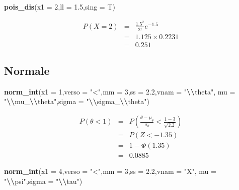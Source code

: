 \documentclass[
  11pt,
]{book}
\newenvironment{Shaded}{\begin{snugshade}}{\end{snugshade}}
\newcommand{\AttributeTok}[1]{\textcolor[rgb]{0.13,0.29,0.53}{#1}}
\newcommand{\DecValTok}[1]{\textcolor[rgb]{0.00,0.00,0.81}{#1}}
\newcommand{\FloatTok}[1]{\textcolor[rgb]{0.00,0.00,0.81}{#1}}
\newcommand{\FunctionTok}[1]{\textcolor[rgb]{0.13,0.29,0.53}{\textbf{#1}}}
\newcommand{\NormalTok}[1]{#1}
\newcommand{\SpecialCharTok}[1]{\textcolor[rgb]{0.81,0.36,0.00}{\textbf{#1}}}
\newcommand{\StringTok}[1]{\textcolor[rgb]{0.31,0.60,0.02}{#1}}
\theoremstyle{mytheoremstyle}
\theoremstyle{mydefstyle}
\begin{document}
\begin{Shaded}
\begin{Highlighting}[]
\FunctionTok{pois\_dis}\NormalTok{(}\AttributeTok{x1 =} \DecValTok{2}\NormalTok{,}\AttributeTok{ll =} \FloatTok{1.5}\NormalTok{,}\AttributeTok{sing =}\NormalTok{ T)}
\end{Highlighting}
\end{Shaded}

\begin{eqnarray*}
   P( X = 2 )  &=& \frac{ 1.5 ^{ 2 }}{ 2 !}e^{- 1.5 }\\                 &=& 1.125 \times 0.2231 \\                 &=& 0.251 
\end{eqnarray*}

\subsection{Normale}\label{normale}

\begin{Shaded}
\begin{Highlighting}[]
\FunctionTok{norm\_int}\NormalTok{(}\AttributeTok{x1 =} \DecValTok{1}\NormalTok{,}\AttributeTok{verso =} \StringTok{"\textless{}"}\NormalTok{,}\AttributeTok{mm =} \DecValTok{3}\NormalTok{,}\AttributeTok{ss =} \FloatTok{2.2}\NormalTok{,}\AttributeTok{vnam =} \StringTok{"}\SpecialCharTok{\textbackslash{}\textbackslash{}}\StringTok{theta"}\NormalTok{,}
             \AttributeTok{mu =} \StringTok{"}\SpecialCharTok{\textbackslash{}\textbackslash{}}\StringTok{mu\_}\SpecialCharTok{\textbackslash{}\textbackslash{}}\StringTok{theta"}\NormalTok{,}\AttributeTok{sigma =} \StringTok{"}\SpecialCharTok{\textbackslash{}\textbackslash{}}\StringTok{sigma\_}\SpecialCharTok{\textbackslash{}\textbackslash{}}\StringTok{theta"}\NormalTok{)}
\end{Highlighting}
\end{Shaded}

\begin{eqnarray*}
      P( \theta   <   1 ) 
        &=& P\left(  \frac { \theta  -  \mu_\theta }{ \sigma_\theta }  <  \frac { 1  -  3 }{\sqrt{ 2.2 }} \right)  \\
                 &=& P\left(  Z   <   -1.35 \right) \\    
                 &=&  1-\Phi( 1.35 ) \\ &=&  0.0885 
      \end{eqnarray*}

\begin{Shaded}
\begin{Highlighting}[]
\FunctionTok{norm\_int}\NormalTok{(}\AttributeTok{x1 =} \DecValTok{4}\NormalTok{,}\AttributeTok{verso =} \StringTok{"\textless{}"}\NormalTok{,}\AttributeTok{mm =} \DecValTok{3}\NormalTok{,}\AttributeTok{ss =} \FloatTok{2.2}\NormalTok{,}\AttributeTok{vnam =} \StringTok{"X"}\NormalTok{,}
             \AttributeTok{mu =} \StringTok{"}\SpecialCharTok{\textbackslash{}\textbackslash{}}\StringTok{psi"}\NormalTok{,}\AttributeTok{sigma =} \StringTok{"}\SpecialCharTok{\textbackslash{}\textbackslash{}}\StringTok{tau"}\NormalTok{)}
\end{Highlighting}
\end{Shaded}
\end{document}
